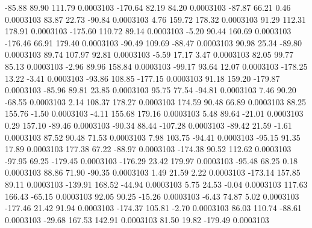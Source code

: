       -85.88       89.90      111.79     0.0003103
     -170.64       82.19       84.20     0.0003103
      -87.87       66.21        0.46     0.0003103
       83.87       22.73      -90.84     0.0003103
        4.76      159.72      178.32     0.0003103
       91.29      112.31      178.91     0.0003103
     -175.60      110.72       89.14     0.0003103
       -5.20       90.44      160.69     0.0003103
     -176.46       66.91      179.40     0.0003103
      -90.49      109.69      -88.47     0.0003103
       90.98       25.34      -89.80     0.0003103
       89.74      107.97       92.81     0.0003103
       -5.59       17.17        3.47     0.0003103
       82.05       99.77       85.13     0.0003103
       -2.96       89.96      158.84     0.0003103
      -99.17       93.64       12.07     0.0003103
     -178.25       13.22       -3.41     0.0003103
      -93.86      108.85     -177.15     0.0003103
       91.18      159.20     -179.87     0.0003103
      -85.96       89.81       23.85     0.0003103
       95.75       77.54      -94.81     0.0003103
        7.46       90.20      -68.55     0.0003103
        2.14      108.37      178.27     0.0003103
      174.59       90.48       66.89     0.0003103
       88.25      155.76       -1.50     0.0003103
       -4.11      155.68      179.16     0.0003103
        5.48       89.64      -21.01     0.0003103
        0.29      157.10      -89.46     0.0003103
      -90.34       88.44     -107.28     0.0003103
      -89.42       21.59       -1.61     0.0003103
       87.52       90.48       71.53     0.0003103
        7.98      103.75      -94.41     0.0003103
      -95.15       91.35       17.89     0.0003103
      177.38       67.22      -88.97     0.0003103
     -174.38       90.52      112.62     0.0003103
      -97.95       69.25     -179.45     0.0003103
     -176.29       23.42      179.97     0.0003103
      -95.48       68.25        0.18     0.0003103
       88.86       71.90      -90.35     0.0003103
        1.49       21.59        2.22     0.0003103
     -173.14      157.85       89.11     0.0003103
     -139.91      168.52      -44.94     0.0003103
        5.75       24.53       -0.04     0.0003103
      117.63      166.43      -65.15     0.0003103
       92.05       90.25      -15.26     0.0003103
       -6.43       74.87        5.02     0.0003103
     -177.46       21.42       91.94     0.0003103
     -174.37      105.81       -2.70     0.0003103
       86.03      110.74      -88.61     0.0003103
      -29.68      167.53      142.91     0.0003103
       81.50       19.82     -179.49     0.0003103
